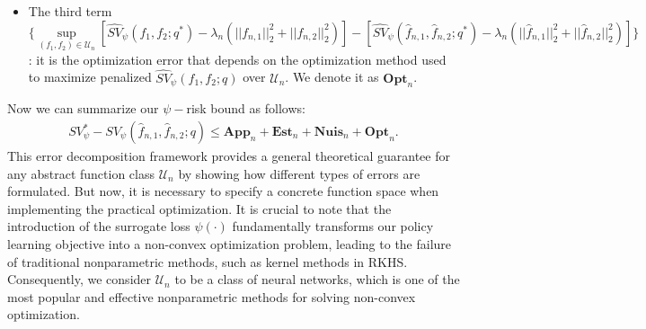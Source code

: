 \documentclass[10pt]{article}
\theoremstyle{remark} \newtheorem{rem}{Remark}
\begin{document}
\begin{itemize}
\begin{align}
            &\quad - \big\{I(Y_2>q^*)\hat q_{22}^{(-k)}[\psi(A_1\tilde f_{n,1},A_2 \tilde f_{n,2})  - \psi(A_1\hat f_{n,1},A_2 \hat f_{n,2})]\big\}\Big\} \notag\\
            =& (\mathbb{P}-\mathbb{P}_n)[\xi_{\tilde f_{n,1}, \tilde f_{n,2}, \hat f_{n,1}, \hat f_{n,2}}] + \frac{1}{K} \sum_{k=1}^K \mathbb{P}_{n,k}\Big\{I(Y_2>q^*)(q_{22}-\hat q_{22}^{(-k)})[\psi(A_1\tilde f_{n,1},A_2 \tilde f_{n,2})  - \psi(A_1\hat f_{n,1},A_2 \hat f_{n,2})]\Big\} \notag\\
            \leq& (\mathbb{P}-\mathbb{P}_n)[\xi_{\tilde f_{n,1}, \tilde f_{n,2}, \hat f_{n,1}, \hat f_{n,2}}] + \sup_k \mathbb{P}_{n,k}\Big\{I(Y_2>q^*)(q_{22}-\hat q_{22}^{(-k)})[\psi(A_1\tilde f_{n,1},A_2 \tilde f_{n,2})  - \psi(A_1\hat f_{n,1},A_2 \hat f_{n,2})]\Big\}, \label{esterr}
        \end{align}
        where the second equality is by supposing the sample size $n$ is divisible by $K$ hence $\mathbb{P}_n = \frac{1}{K}\sum_{k=1}^K \mathbb{P}_{n,k}$.
        We denote the first term in \eqref{esterr} as $\textbf{Est}_n$ in line with (Laha2021), and the second term as $\textbf{Nuis}_n$ since it is caused by estimating the nuisance function. 

    \item The third term $\Big\{\sup\limits_{(f_1,f_2)\in\mathcal{U}_n}[\hat{SV}_\psi(f_1,f_2;q^*) - \lambda_n(||f_{n,1}||_{2}^2+||f_{n,2}||_{2}^2)] - [\hat{SV}_\psi(\hat f_{n,1},\hat f_{n,2};q^*)-\lambda_n(||\hat f_{n,1}||_{2}^2+||\hat f_{n,2}||_{2}^2)] \Big\}$: it is the optimization error that depends on the optimization method used to maximize penalized $\hat{SV}_\psi(f_1,f_2;q)$ over $\mathcal{U}_n$. We denote it as $\textbf{Opt}_n$.
\end{itemize}

Now we can summarize our $\psi-$risk bound as follows: 
\begin{align}
    SV_\psi^* - SV_\psi(\hat f_{n,1}, \hat f_{n,2};q) \leq \textbf{App}_n + \textbf{Est}_n + \textbf{Nuis}_n + \textbf{Opt}_n. \label{riskbound}
\end{align}
This error decomposition framework provides a general theoretical guarantee for any abstract function class $\mathcal{U}_n$ by showing how different types of errors are formulated.
But now, it is necessary to specify a concrete function space when implementing the practical optimization.
It is crucial to note that the introduction of the surrogate loss $\psi(\cdot)$ fundamentally transforms our policy learning objective into a non-convex optimization problem, leading to the failure of traditional nonparametric methods, such as kernel methods in RKHS.
Consequently, we consider $\mathcal{U}_n$ to be a class of neural networks, which is one of the most popular and effective nonparametric methods for solving non-convex optimization.
\end{document}
